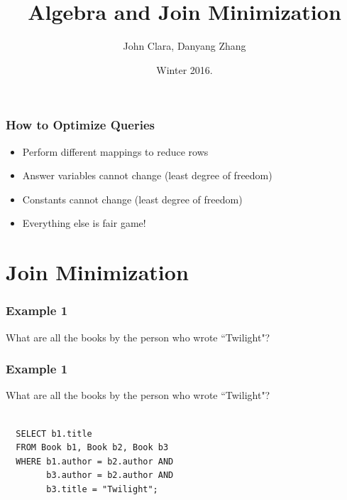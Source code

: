 \documentclass{beamer}
\begin{document}
\title{Algebra and Join Minimization}
\author{John Clara, Danyang Zhang}
\date[WI 2016]{Winter 2016.}

\subject{Algebra and Join Minimization}

\begin{frame}
  \titlepage
\end{frame}

\begin{frame}
  \frametitle{How to Optimize Queries}
  \begin{itemize}
    \item Perform different mappings to reduce rows
    \item Answer variables cannot change (least degree of freedom)
    \item Constants cannot change (least degree of freedom)
    \item Everything else is fair game!
  \end{itemize}
\end{frame}

\section{Join Minimization}
\begin{frame}
  \frametitle{Example 1}
  What are all the books by the person who wrote ``Twilight"?
\end{frame}

\begin{frame}[fragile]
  \frametitle{Example 1}
  What are all the books by the person who wrote ``Twilight"?\\
  \hfill \\
\begin{verbatim} 
  SELECT b1.title
  FROM Book b1, Book b2, Book b3
  WHERE b1.author = b2.author AND
        b3.author = b2.author AND
        b3.title = "Twilight";
\end{verbatim}

\end{frame}
\end{document}
